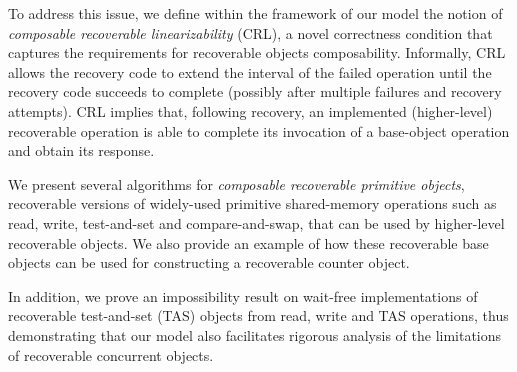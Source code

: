 To address this issue, we define within the framework of our model
the notion of \emph{composable recoverable linearizability} (CRL),
a novel correctness condition that captures the requirements
for recoverable objects composability.
Informally, CRL allows the recovery code to extend the interval
of the failed operation until the recovery code succeeds to complete
(possibly after multiple failures and recovery attempts). CRL implies that,
following recovery, an implemented (higher-level) recoverable operation
is able to complete its invocation of a base-object operation and obtain its response.



We present several algorithms for \emph{composable recoverable primitive objects},
recoverable versions of widely-used primitive shared-memory operations such as
read, write, test-and-set and compare-and-swap,
that can be used by higher-level recoverable objects.
We also provide an example of how these recoverable base objects can be
used for constructing a recoverable counter object.

In addition, we prove an impossibility result on wait-free implementations of recoverable test-and-set (TAS) objects from read, write and TAS operations, thus demonstrating that our model also facilitates
rigorous analysis of the limitations of recoverable concurrent objects.


